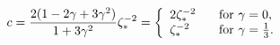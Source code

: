 \begin{equation}
c
   = \frac{2(1-2\gamma+3\gamma^2)}{1+3\gamma^2}\zeta^{-2}_\ast
   = \left\{ 
            \begin{array}{ll}
              2\zeta^{-2}_\ast & \textrm{\,\,\, for } \gamma=0, \\
               \zeta^{-2}_\ast & \textrm{\,\,\, for } \gamma=\frac{1}{3}.
            \end{array} 
      \right.
\label{eq:slope_condition}
\end{equation} 
